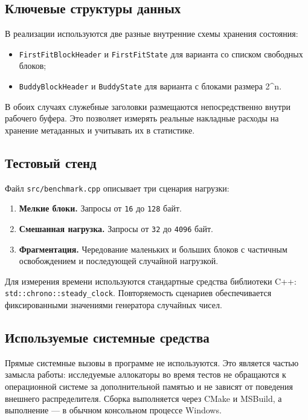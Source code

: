 \documentclass[unicode, 12pt, a4paper, oneside, fleqn]{article}
\newcommand{\powertwoname}{2\textasciicircum{}n}
\begin{document}
\subsection{Ключевые структуры данных}

В реализации используются две разные внутренние схемы хранения состояния:
\begin{itemize}[leftmargin=1.5cm]
\item \texttt{FirstFitBlockHeader} и \texttt{FirstFitState} для варианта со списком свободных блоков;
\item \texttt{BuddyBlockHeader} и \texttt{BuddyState} для варианта с блоками размера \powertwoname.
\end{itemize}

В обоих случаях служебные заголовки размещаются непосредственно внутри рабочего буфера. Это позволяет измерять реальные накладные расходы на хранение метаданных и учитывать их в статистике.

\subsection{Тестовый стенд}

Файл \texttt{src/benchmark.cpp} описывает три сценария нагрузки:
\begin{enumerate}[leftmargin=1.5cm]
\item \textbf{Мелкие блоки.} Запросы от \texttt{16} до \texttt{128} байт.
\item \textbf{Смешанная нагрузка.} Запросы от \texttt{32} до \texttt{4096} байт.
\item \textbf{Фрагментация.} Чередование маленьких и больших блоков с частичным освобождением и последующей случайной нагрузкой.
\end{enumerate}

Для измерения времени используются стандартные средства библиотеки C++: \texttt{std::chrono::steady\_clock}. Повторяемость сценариев обеспечивается фиксированными значениями генератора случайных чисел.

\subsection{Используемые системные средства}

Прямые системные вызовы в программе не используются. Это является частью замысла работы: исследуемые аллокаторы во время тестов не обращаются к операционной системе за дополнительной памятью и не зависят от поведения внешнего распределителя. Сборка выполняется через CMake и MSBuild, а выполнение --- в обычном консольном процессе Windows.
\end{document}
